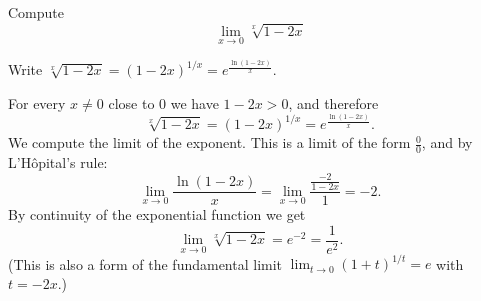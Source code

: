 
\begin{question}
Compute
\[ \lim_{x\to0}\sqrt[x]{1-2x} \]
\end{question}

\begin{hint}
Write $\sqrt[x]{1-2x}=(1-2x)^{1/x}=e^{\frac{\ln(1-2x)}{x}}$.
\end{hint}

\begin{solution}
For every $x\neq0$ close to $0$ we have $1-2x>0$, and therefore
\[ \sqrt[x]{1-2x}=(1-2x)^{1/x}=e^{\frac{\ln(1-2x)}{x}}. \]
We compute the limit of the exponent. This is a limit of the form $\frac00$, and by L'Hôpital's rule:
\[ \lim_{x\to0}\frac{\ln(1-2x)}{x}=\lim_{x\to0}\frac{\frac{-2}{1-2x}}{1}=-2. \]
By continuity of the exponential function we get
\[ \lim_{x\to0}\sqrt[x]{1-2x}=e^{-2}=\boxed{\frac1{e^2}}. \]
(This is also a form of the fundamental limit $\lim_{t\to0}(1+t)^{1/t}=e$ with $t=-2x$.)
\end{solution}
